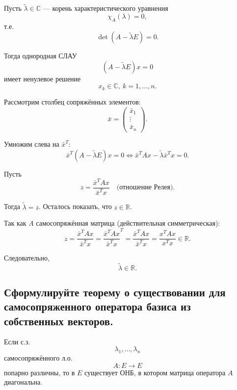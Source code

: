 \begin{Proof}
    Пусть $\tilde{\lambda} \in \mathbb{C}$ --- корень характеристического уравнения
    \[
        \chi_A(\lambda) = 0,
    \]
    т.е.
    \[
        \det(A - \tilde{\lambda} E) = 0.
    \]

    Тогда однородная СЛАУ
    \[
        (A - \tilde{\lambda} E)x = 0
    \]
    имеет ненулевое решение
    \[
        x_k \in \mathbb{C},\ k=1,\ldots,n.
    \]
    
    Рассмотрим столбец сопряжённых элементов:
    \[
        \bar{x} =
        \begin{pmatrix}
            \bar{x}_1\\
            \vdots\\
            \bar{x}_n
        \end{pmatrix}.
    \]

    Умножим слева на $\bar{x}^T$:
    \[
        \bar{x}^T (A - \tilde{\lambda} E)x = 0
        \Longleftrightarrow
        \bar{x}^T A x - \tilde{\lambda} \bar{x}^T x = 0.
    \]

    Пусть
    \[
        z = \frac{\bar{x}^T A x}{\bar{x}^T x} \quad \text{(отношение Релея)}.
    \]

    Тогда $\tilde{\lambda} = z$. Осталось показать, что $z \in \mathbb{R}$.

    Так как $A$ самосопряжённая матрица (действительная симметрическая):
    \[
        z = \frac{\bar{x}^T A x}{\bar{x}^T x}
        = \frac{\bar{x}^T A x}{\bar{x}^T x}^T
        = \frac{\bar{x}^T A x}{\bar{x}^T x}
        = \frac{x^T A x}{x^T x} \in \mathbb{R}.
    \]

    Следовательно,
    \[
        \tilde{\lambda} \in \mathbb{R}.
    \]
\end{Proof}
\subsection{Сформулируйте теорему о существовании для самосопряженного оператора базиса из собственных векторов.}

\begin{theorem}
    Если с.з. 
    \[
        \lambda_1, \ldots, \lambda_n
    \]
    самосопряжённого л.о.
    \[
        A: E \to E
    \]
    попарно различны, то в $E$ существует ОНБ, в котором матрица оператора $A$ диагональна.
\end{theorem}

